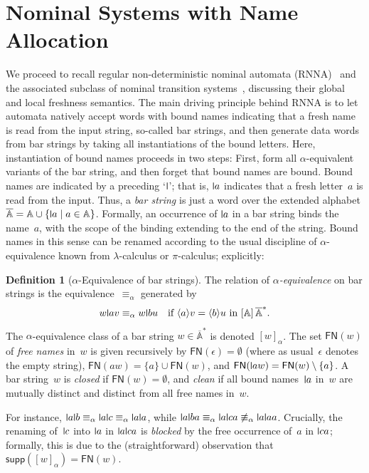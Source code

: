 \documentclass[a4paper,UKenglish,cleveref,thm-restate,numberwithinsect,final]{lipics-v2021}
\newcommand{\FN}{\mathsf{FN}}
\newcommand{\Names}{\mathbb{A}}
\newcommand{\barNames}{\overline{\Names}}
\newcommand{\alphaeq}{\equiv_\alpha}
\newcommand{\supp}{\mathsf{supp}}
\newcommand{\bind}[1]{\langle #1\rangle}
\theoremstyle{plain}
\newcommand{\midmid}{\hspace{0.2ex}{\rule[-0.1ex]{0.6pt}{1.65ex}}\hspace{0.2ex}}
\newcommand{\newletter}[1]{{\midmid}#1}
\numberwithin{equation}{section}
\newcommand{\+}[1]{\mathcal{#1}\xspace}
\theoremstyle{definition}
\newtheorem{defn}[theorem]{Definition}
\begin{document}
\section{Nominal Systems  with Name Allocation}
\label{sec:rnna}
\noindent We proceed to recall regular non-deterministic nominal
automata (RNNA)~\cite{SchroderEA17} and the associated subclass of
nominal transition systems~\cite{ParrowEA21}, discussing their global
and local freshness semantics. The main driving principle behind RNNA
is to let automata natively accept words with bound names indicating
that a fresh name is read from the input string, so-called bar
strings, and then generate data words from bar strings by taking all
instantiations of the bound letters. Here, instantiation of bound
names proceeds in two steps: First, form all $\alpha$-equivalent
variants of the bar string, and then forget that bound names are
bound. Bound names are indicated by a preceding `$\newletter$'; that
is, $\newletter a$ indicates that a fresh letter~$a$ is read from the
input. Thus, a \emph{bar string} is just a word over the extended
alphabet $\barNames=\Names\cup\{\newletter a\mid a\in\Names\}$.
Formally, an occurrence of $\newletter a$ in a bar string binds the
name~$a$, with the scope of the binding extending to the end of the
string. Bound names in this sense can be renamed according to the
usual discipline of $\alpha$-equivalence known from $\lambda$-calculus
or $\pi$-calculus; explicitly:
\begin{defn}[$\alpha$-Equivalence of bar strings]
  The relation of \emph{$\alpha$-equivalence} on bar strings is the
  equivalence~\(\alphaeq\) generated by
  \begin{equation}\label{eq:bar-alpha}
    w\newletter{a}v \alphaeq w\newletter{b}u \quad \text{if } \bind av = \bind bu
    \text{ in } [\Names]\,\barNames^*.
  \end{equation}
  The $\alpha$-equivalence class of a bar string \(w\in \barNames^*\)
  is denoted \([w]_{\alpha}\). The set $\FN(w)$ of \emph{free names}
  in~$w$ is given recursively by $\FN(\epsilon)=\emptyset$ (where as
  usual~$\epsilon$ denotes the empty string),
  $\FN(aw)=\{a\}\cup\FN(w)$, and
  $\FN(\newletter aw)=\FN(w)\setminus\{a\}$. A bar string~$w$ is
  \emph{closed} if $\FN(w)=\emptyset$, and \emph{clean} if all bound
  names~$\newletter a$ in~$w$ are mutually distinct and distinct from
  all free names in~$w$.
\end{defn}
\noindent For instance,
$\newletter a\newletter b\alphaeq\newletter a\newletter c\alphaeq
\newletter a\newletter a$, while
$\newletter a\newletter b a\alphaeq\newletter a\newletter
ca\not\alphaeq\newletter a\newletter a a$. Crucially, the renaming
of~$\newletter c$ into $\newletter a$ in $\newletter a\newletter c a$
is \emph{blocked} by the free occurrence of~$a$ in $\newletter ca$;
formally, this is due to the (straightforward) observation that
$\supp([w]_\alpha)=\FN(w)$.
\end{document}
